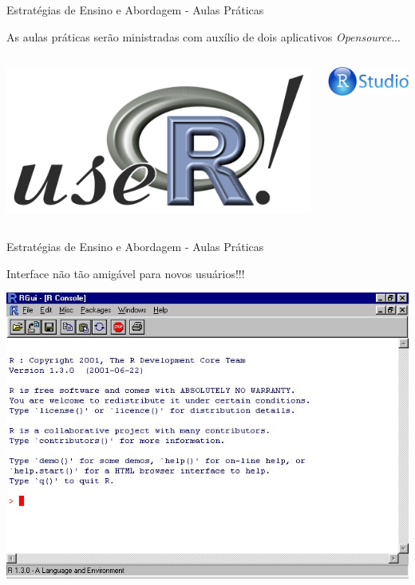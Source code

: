 \documentclass{bredelebeamer}
\begin{document}
\begin{frame}{Estratégias de Ensino e Abordagem - Aulas Práticas}

As aulas práticas serão ministradas com auxílio de dois aplicativos
\emph{\textit{Opensource}}...

\vspace{1cm} 

\begin{columns}
\begin{column}{0.5\textwidth}
\includegraphics[scale=0.15]{images/useR-large.png}
\end{column}

\begin{column}{0.5\textwidth}
\includegraphics[scale=0.5]{images/RStudio.png}
\end{column}
\end{columns}

\end{frame}

\begin{frame}{Estratégias de Ensino e Abordagem - Aulas Práticas}

Interface \alert{não tão amigável} para novos usuários!!!

\vspace{.2cm}

\begin{center}
\includegraphics[scale=0.5]{images/R-prompt.jpg}
\end{center}
\end{frame}
\end{document}
